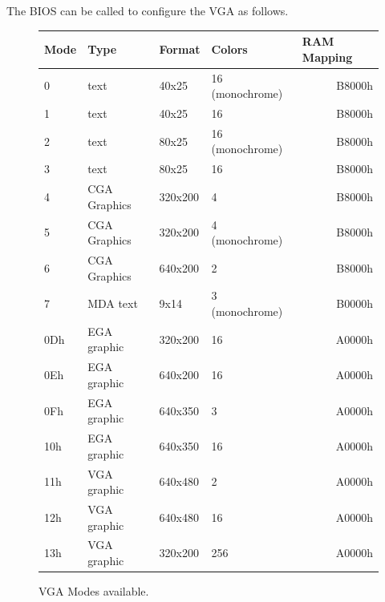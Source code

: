 \documentclass[book.tex]{subfiles}
\begin{document}
The BIOS can be called to configure the VGA as follows.
\vspace{-10pt}
\begin{figure}[H]
\centering
\begin{table}[H]
\begin{tabularx}{\textwidth}[c]{llllr}
\hline
\textbf{Mode} & \textbf{Type} & \textbf{Format} & \textbf{Colors} & \multicolumn{1}{l}{\textbf{RAM Mapping}} \\ \hline
0             & text          & 40x25           & 16 (monochrome) & B8000h                                \\ \hline
1             & text          & 40x25           & 16              & B8000h                                \\ \hline
2             & text          & 80x25           & 16 (monochrome) & B8000h                                \\ \hline
3             & text          & 80x25           & 16              & B8000h                                \\ \hline
4             & CGA Graphics  & 320x200         & 4               & B8000h                                \\ \hline
5             & CGA Graphics  & 320x200         & 4 (monochrome)  & B8000h                                \\ \hline
6             & CGA Graphics  & 640x200         & 2               & B8000h                                \\ \hline
7             & MDA text      & 9x14            & 3 (monochrome)  & B0000h                                \\ \hline
0Dh           & EGA graphic   & 320x200         & 16              & A0000h                                \\ \hline
0Eh           & EGA graphic   & 640x200         & 16              & A0000h                                \\ \hline
0Fh           & EGA graphic   & 640x350         & 3               & A0000h                                \\ \hline
10h           & EGA graphic   & 640x350         & 16              & A0000h                                \\ \hline
11h           & VGA graphic   & 640x480         & 2               & A0000h                                \\ \hline
12h           & VGA graphic   & 640x480         & 16              & A0000h                                \\ \hline
13h           & VGA graphic   & 320x200         & 256             & A0000h                                \\ \hline
\end{tabularx}
\end{table}
\caption{VGA Modes available.}%
\label{vga-modes-available}
 \end{figure}
 
\end{document}
